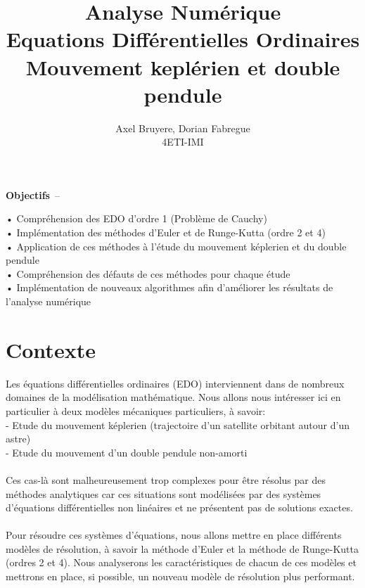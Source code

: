 \documentclass[11pt]{article} %
\title{Analyse Numérique\\Equations Différentielles Ordinaires\\Mouvement keplérien et double pendule}
\author{Axel Bruyere, Dorian Fabregue\\4ETI-IMI}
\newcommand \tab[1][1cm]{\hspace*{#1}}
\begin{document}

\maketitle

\vspace*{15mm}
{\Large\bf Objectifs}~--~~\begin{minipage}[t]{135mm}
• Compréhension des EDO d'ordre 1 (Problème de Cauchy)\\
• Implémentation des méthodes d'Euler et de Runge-Kutta (ordre 2 et 4)\\
• Application de ces méthodes à l'étude du mouvement képlerien et du double pendule\\
• Compréhension des défauts de ces méthodes pour chaque étude\\
• Implémentation de nouveaux algorithmes afin d'améliorer les résultats de l'analyse numérique\\
\end{minipage}
\vspace*{10mm}

\section{Contexte}
Les équations différentielles ordinaires (EDO) interviennent dans de nombreux domaines de la modélisation mathématique. Nous allons nous intéresser ici en particulier à deux modèles mécaniques particuliers, à savoir:\\
\tab - Etude du mouvement képlerien (trajectoire d'un satellite orbitant autour d'un astre)\\
\tab - Etude du mouvement d'un double pendule non-amorti\\\\
Ces cas-là sont malheureusement trop complexes pour être résolus par des méthodes analytiques car ces situations sont modélisées par des systèmes d'équations différentielles non linéaires et ne présentent pas de solutions exactes.\\\\
Pour résoudre ces systèmes d'équations, nous allons mettre en place différents modèles de résolution, à savoir la méthode d'Euler et la méthode de Runge-Kutta (ordres 2 et 4). Nous analyserons les caractéristiques de chacun de ces modèles et mettrons en place, si possible, un nouveau modèle de résolution plus performant.
\end{document}
